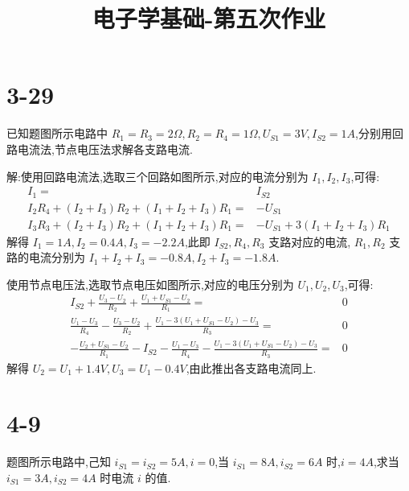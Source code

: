 
\title{电子学基础-第五次作业}


    \pagestyle{empty}
    \maketitle
    \section{3-29} 已知题图所示电路中 $R_1=R_3=2\Omega,R_2=R_4=1\Omega,U_{S1}=3V,I_{S2}=1A$,分别用回路电流法,节点电压法求解各支路电流.
    \begin{figure}[ht]
        \centering
        \label{figure:01}
    \end{figure}

        解:使用回路电流法,选取三个回路如图所示,对应的电流分别为 $I_1,I_2,I_3$,可得:
        \begin{align}
            I_1=&I_{S 2}\\
            I_2R_4+(I_2+I_3)R_2+(I_1+I_2+I_3)R_1=&-U_{S 1}\\
            I_3R_3+(I_2+I_3)R_2+(I_1+I_2+I_3)R_1=&-U_{S 1}+3(I_1+I_2+I_3)R_1
        \end{align}
        解得 $I_1=1A,I_2=0.4A,I_3=-2.2A$,此即 $I_{S 2},R_4,R_3$ 支路对应的电流, $R_1,R_2$ 支路的电流分别为 $I_1+I_2+I_3=-0.8A,I_2+I_3=-1.8A$.

        使用节点电压法,选取节点电压如图所示,对应的电压分别为 $U_1,U_2,U_3$,可得:
        \begin{align}
            I_{S 2}+\frac{U_3-U_2}{R_2}+\frac{U_1+U_{S 1}-U_2}{R_1}=&0\\
            \frac{U_1-U_3}{R_4}-\frac{U_3-U_2}{R_2}+\frac{U_1-3(U_1+U_{S 1}-U_2)-U_3}{R_3}=&0\\
            -\frac{U_2+U_{S 1}-U_2}{R_1}-I_{S 2}-\frac{U_1-U_3}{R_4}-\frac{U_1-3(U_1+U_{S 1}-U_2)-U_3}{R_3}=&0
        \end{align}
        解得 $U_2=U_1+1.4V,U_3=U_1-0.4V$,由此推出各支路电流同上.
        \section{4-9} 题图所示电路中,己知 $i_{S 1}=i_{S 2}=5A,i=0$,当 $i_{S 1}=8A,i_{S 2}=6A$ 时,$i=4A$,求当 $i_{S 1}=3A,i_{S 2}=4A$ 时电流 $i$ 的值.
        \begin{figure}[ht]
            \centering
            \label{figure:02}
        \end{figure}

